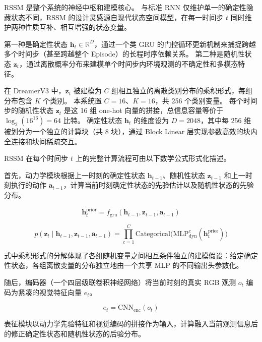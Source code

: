 \documentclass[12pt,a4paper]{ctexart}
\begin{document}
RSSM 是整个系统的神经中枢和建模核心。
与标准 RNN 仅维护单一的确定性隐藏状态不同，RSSM 的设计灵感源自现代状态空间模型，在每一时间步 $t$ 同时维护两种性质互补、相互增强的状态变量。

第一种是确定性状态 $\mathbf{h}_t \in \mathbb{R}^{D}$，通过一个类 GRU 的门控循环更新机制来捕捉跨越多个时间步（甚至跨越整个 Episode）的长程时序依赖关系。
第二种是随机性状态 $\mathbf{z}_t$，通过离散概率分布来建模单个时间步内环境观测的不确定性和多模态特征。

在 DreamerV3 中，$\mathbf{z}_t$ 被建模为 $C$ 组相互独立的离散类别分布的乘积形式，每组分布包含 $K$ 个类别。
本系统置 $C = 16$、$K = 16$，共 256 个类别变量。
每个时间步的随机性状态 $\mathbf{z}_t$ 是这 16 组 one-hot 向量的拼接，总信息容量等价于 $\log_2(16^{16}) = 64$ 比特。
确定性状态 $\mathbf{h}_t$ 的维度设为 $D = 2048$，其中每 256 维被划分为一个独立的计算块（共 8 块），通过 Block Linear 层实现参数高效的块内全连接和块间稀疏交互。

RSSM 在每个时间步 $t$ 上的完整计算流程可由以下数学公式形式化描述。

首先，动力学模块根据上一时刻的确定性状态 $\mathbf{h}_{t-1}$、随机性状态 $\mathbf{z}_{t-1}$ 和上一时刻执行的动作 $\mathbf{a}_{t-1}$，计算当前时刻确定性状态的先验估计以及随机性状态的先验分布。

\begin{equation}
    \mathbf{h}_t^{\text{prior}} = f_{\text{gru}}(\mathbf{h}_{t-1}, \mathbf{z}_{t-1}, \mathbf{a}_{t-1})
    \label{eq:prior_h}
\end{equation}

\begin{equation}
    p(\mathbf{z}_t \mid \mathbf{h}_{t-1}, \mathbf{z}_{t-1}, \mathbf{a}_{t-1}) = \prod_{c=1}^{C} \text{Categorical}\big(\text{MLP}_{\text{dyn}}^c(\mathbf{h}_t^{\text{prior}})\big)
    \label{eq:prior_z}
\end{equation}

式中乘积形式的分解体现了各组随机变量之间相互条件独立的建模假设：给定确定性状态，各组离散变量的分布独立地由一个共享 MLP 的不同输出头参数化。

随后，编码器（一个四层级联卷积神经网络）将当前时刻的真实 RGB 观测 $o_t$ 编码为紧凑的视觉特征向量 $e_t$。

\begin{equation}
    e_t = \text{CNN}_{\text{enc}}(o_t)
    \label{eq:encoder}
\end{equation}

表征模块以动力学先验特征和视觉编码的拼接作为输入，计算融入当前观测信息后的修正确定性状态和随机性状态的后验分布。
\end{document}
